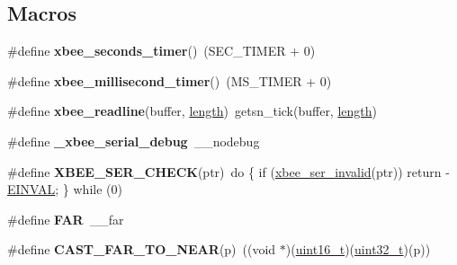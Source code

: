 \subsection*{Macros}
\begin{DoxyCompactItemize}
\item 
\hypertarget{group__hal__rabbit_gae8fb830d9a707a0f6d60a2c480ed7dfc}{\#define {\bfseries xbee\-\_\-seconds\-\_\-timer}()~(S\-E\-C\-\_\-\-T\-I\-M\-E\-R + 0)}\label{group__hal__rabbit_gae8fb830d9a707a0f6d60a2c480ed7dfc}

\item 
\hypertarget{group__hal__rabbit_gae68dcfee6e7c24b7a401c769c3fc1dd0}{\#define {\bfseries xbee\-\_\-millisecond\-\_\-timer}()~(M\-S\-\_\-\-T\-I\-M\-E\-R + 0)}\label{group__hal__rabbit_gae68dcfee6e7c24b7a401c769c3fc1dd0}

\item 
\hypertarget{group__hal__rabbit_gab5b9fab5902286c1bb085bfd9dfe9db0}{\#define {\bfseries xbee\-\_\-readline}(buffer, \hyperlink{group__zdo_gab2b3adeb2a67e656ff030b56727fd0ac}{length})~getsn\-\_\-tick(buffer, \hyperlink{group__zdo_gab2b3adeb2a67e656ff030b56727fd0ac}{length})}\label{group__hal__rabbit_gab5b9fab5902286c1bb085bfd9dfe9db0}

\item 
\hypertarget{group__hal__rabbit_ga0d8197fec29383ae164d587e01ab2e13}{\#define {\bfseries \-\_\-xbee\-\_\-serial\-\_\-debug}~\-\_\-\-\_\-nodebug}\label{group__hal__rabbit_ga0d8197fec29383ae164d587e01ab2e13}

\item 
\hypertarget{group__hal__rabbit_ga755b7e850db6200a6f43b741c678ae53}{\#define {\bfseries X\-B\-E\-E\-\_\-\-S\-E\-R\-\_\-\-C\-H\-E\-C\-K}(ptr)~do \{ if (\hyperlink{group__xbee__serial_gae7f838b59f553507bf81a86042fe9cd7}{xbee\-\_\-ser\-\_\-invalid}(ptr)) return -\/\hyperlink{group__hal_ga2d1678d5a7cc8ce499643f3b8957def4}{E\-I\-N\-V\-A\-L}; \} while (0)}\label{group__hal__rabbit_ga755b7e850db6200a6f43b741c678ae53}

\item 
\hypertarget{group__hal__rabbit_gaef060b3456fdcc093a7210a762d5f2ed}{\#define {\bfseries F\-A\-R}~\-\_\-\-\_\-far}\label{group__hal__rabbit_gaef060b3456fdcc093a7210a762d5f2ed}

\item 
\hypertarget{group__hal__rabbit_ga0220c5cb877cc5718402ab41b91b7252}{\#define {\bfseries C\-A\-S\-T\-\_\-\-F\-A\-R\-\_\-\-T\-O\-\_\-\-N\-E\-A\-R}(p)~((void $\ast$)(\hyperlink{group__hal_ga5a8b2dc9e45a9ee81a94ef304fb62505}{uint16\-\_\-t})(\hyperlink{group__hal__dos_ga09a1e304d66d35dd47daffee9731edaa}{uint32\-\_\-t})(p))}\label{group__hal__rabbit_ga0220c5cb877cc5718402ab41b91b7252}


\end{DoxyCompactItemize}
